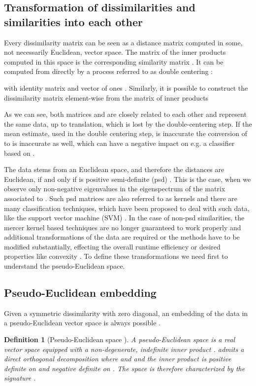\documentclass[twoside,11pt]{article}
\newtheorem{definition}[theorem]{Definition}
\begin{document}
\subsection{Transformation of dissimilarities and similarities into each other}
Every dissimilarity matrix  can be seen as a distance matrix
computed in some, not necessarily Euclidean, vector space.
The matrix of the inner products computed in this space
is the corresponding similarity matrix .
It can be computed from  directly
by a process referred to as double centering \cite{Pekalska2005a}:

with identity matrix   and vector of ones .
Similarly, it is possible to construct the dissimilarity matrix element-wise
from the matrix of inner products 

As we can see, both matrices  and 
are closely related to each other and represent the same data,
up to translation, which is lost by the double-centering step. 
If the mean estimate, used in the double centering step, is inaccurate
the conversion of  to  is inaccurate as well, which
can have a negative impact on e.g. a classifier based on .

The data stems from an Euclidean space,
and therefore the distances  are Euclidean,
if and only if  is positive semi-definite (psd) \cite{Berg1984}.
This is the case, when we observe only non-negative eigenvalues
in the eigenspectrum of the matrix  associated to .
Such psd matrices  are also referred to as kernels
and there are many classification techniques,
which have been proposed to deal with such data,
like the support vector machine (SVM) \cite{vapnik2000nature}. 
In the case of non-psd similarities, the mercer kernel based techniques
are no longer guaranteed to work properly
and additional transformations of the data are required
or the methods have to be modified substantially, 
effecting the overall runtime efficiency or desired properties like convexity \cite{Ong2004639,Haasdonk2005482}.
To define these transformations we need first
to understand the pseudo-Euclidean space.

\subsection{Pseudo-Euclidean embedding}\label{sec:pseudo_eucl_embedd}
Given a symmetric dissimilarity with zero diagonal,
an embedding of the data in a pseudo-Euclidean vector space
is always possible \cite{Goldfarb1984575}.

\begin{definition}[Pseudo-Euclidean space \cite{Pekalska2005a}]
A pseudo-Euclidean space 
is a real vector space equipped with a non-degenerate,
indefinite inner product .  admits a direct orthogonal decomposition  where
 and  and the inner product is positive definite on  and negative
definite on . The space  is therefore characterized by the signature .
\end{definition}
\end{document}
